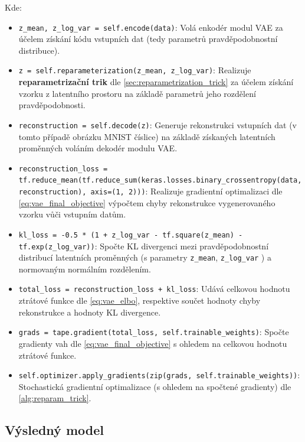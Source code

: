 Kde:
\begin{itemize}
    \item \lstinline{z_mean, z_log_var = self.encode(data)}: Volá enkodér modul VAE za účelem získání kódu vstupních dat (tedy parametrů pravděpodobnostní distribuce).
    \item \lstinline{z = self.reparameterization(z_mean, z_log_var)}: Realizuje \textbf{reparametrizační trik} dle \autoref{sec:reparametrization_trick} za účelem získání vzorku z latentního prostoru na základě parametrů jeho rozdělení pravděpodobnosti.
    \item \lstinline{reconstruction = self.decode(z)}: Generuje rekonstrukci vstupních dat (v tomto případě obrázku MNIST číslice) na základě získaných latentních proměnných voláním dekodér modulu VAE.
    \item \lstinline{reconstruction_loss = tf.reduce_mean(tf.reduce_sum(keras.losses.binary_crossentropy(data, reconstruction), axis=(1, 2)))}: Realizuje gradientní optimalizaci dle \autoref{eq:vae_final_objective} výpočtem chyby rekonstrukce vygenerovaného vzorku vůči vstupním datům.
    \item \lstinline{kl_loss = -0.5 * (1 + z_log_var - tf.square(z_mean) - tf.exp(z_log_var))}: Spočte KL divergenci mezi pravděpodobnostní distribucí latentních proměnných (s parametry \lstinline{z_mean}, \lstinline{z_log_var} ) a normovaným normálním rozdělením.
    \item \lstinline{total_loss = reconstruction_loss + kl_loss}: Udává celkovou hodnotu ztrátové funkce dle \autoref{eq:vae_elbo}, respektive součet hodnoty chyby rekonstrukce a hodnoty KL divergence.
    \item \lstinline{grads = tape.gradient(total_loss, self.trainable_weights)}: Spočte gradienty vah dle \autoref{eq:vae_final_objective} s ohledem na celkovou hodnotu ztrátové funkce.
    \item \lstinline{self.optimizer.apply_gradients(zip(grads, self.trainable_weights))}: Stochastická gradientní optimalizace (s ohledem na spočtené gradienty) dle \autoref{alg:reparam_trick}.
\end{itemize}

\subsection{Výsledný model}



